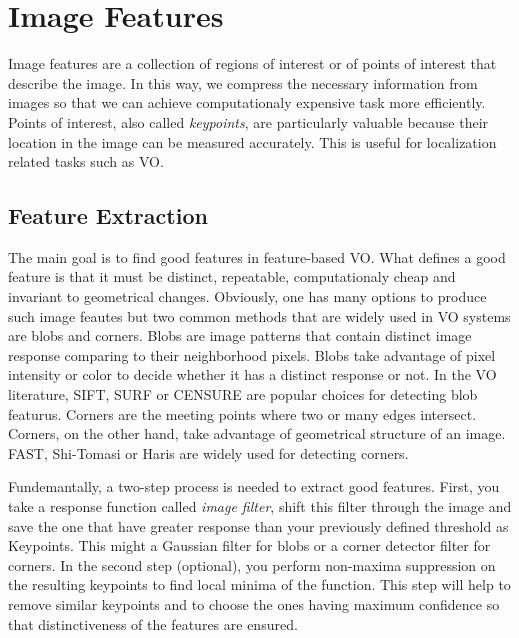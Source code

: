 \documentclass[a4paper]{report}
\numberwithin{figure}{section}
\begin{document}
\section{Image Features} \label{sc_img_features}

Image features are a collection of regions of interest or of points of interest 
that describe the image. In this way, we compress the necessary information 
from images so that we can achieve computationaly expensive task more efficiently.
Points of interest, also called \textit{keypoints}, 
are particularly valuable because their location in the image can be 
measured accurately. This is useful for localization related tasks such as VO. 

\subsection{Feature Extraction} \label{sb_sc_feature_extraction}

The main goal is to find good features in feature-based VO. 
What defines a good feature is that it must be distinct, 
repeatable, computationaly cheap and invariant to geometrical changes. 
Obviously, one has many options to produce such image 
feautes but two common methods that are widely used in VO systems are 
blobs and corners. 
Blobs are image patterns that contain distinct image response comparing to their 
neighborhood pixels. Blobs take advantage of pixel intensity or color to 
decide whether it has a distinct response or not.
In the VO literature, SIFT\cite{}, SURF\cite{} or CENSURE\cite{} are popular 
choices for detecting blob featurus.
Corners are the meeting points where two or many edges intersect. Corners, 
on the other hand, 
take advantage of geometrical structure of an image. FAST\cite{}, Shi-Tomasi or 
Haris\cite{} are widely used for detecting corners.

Fundemantally, a two-step process is needed to extract good features. 
First, you take a response function called \textit{image filter}, 
shift this filter through the image and save the one that have greater 
response than your previously defined threshold as Keypoints. 
This might a Gaussian filter for blobs or a 
corner detector filter for corners. In the second step (optional), 
you perform non-maxima 
suppression on the resulting keypoints to find local minima of the function. 
This step will help to remove similar keypoints and to choose the ones having 
maximum confidence so that distinctiveness of the features are ensured.
\end{document}
